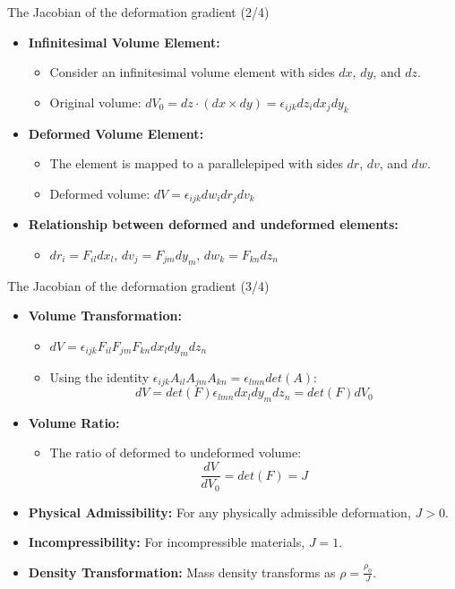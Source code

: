 \documentclass{beamer}
\begin{document}
\begin{frame}{The Jacobian of the deformation gradient (2/4)}
\begin{itemize}
        \item \textbf{Infinitesimal Volume Element:}
        \begin{itemize}
            \item   Consider an infinitesimal volume element with sides $dx$, $dy$, and $dz$.
            \item   Original volume: $dV_0 = dz \cdot (dx \times dy) = \epsilon_{ijk} dz_i dx_j dy_k$
        \end{itemize}
    \item \textbf{Deformed Volume Element:}
        \begin{itemize}
            \item   The element is mapped to a parallelepiped with sides $dr$, $dv$, and $dw$.
            \item   Deformed volume: $dV = \epsilon_{ijk} dw_i dr_j dv_k$
        \end{itemize}
    \item \textbf{Relationship between deformed and undeformed elements:}
         \begin{itemize}
            \item   $dr_i = F_{il} dx_l$,  $dv_j = F_{jm} dy_m$,  $dw_k = F_{kn} dz_n$
         \end{itemize}
\end{itemize}
\end{frame}

\begin{frame}{The Jacobian of the deformation gradient (3/4)}
\begin{itemize}
    \item \textbf{Volume Transformation:}
        \begin{itemize}
            \item   $dV = \epsilon_{ijk} F_{il} F_{jm} F_{kn} dx_l dy_m dz_n$
            \item   Using the identity $\epsilon_{ijk} A_{il} A_{jm} A_{kn} = \epsilon_{lmn} det(A)$:
                \[
                dV = det(F) \epsilon_{lmn} dx_l dy_m dz_n = det(F) dV_0
                \]
        \end{itemize}
    \item \textbf{Volume Ratio:}
        \begin{itemize}
            \item   The ratio of deformed to undeformed volume:
                \[
                \frac{dV}{dV_0} = det(F) = J
                \]
        \end{itemize}
    \item \textbf{Physical Admissibility:} For any physically admissible deformation, $J > 0$.
    \item \textbf{Incompressibility:} For incompressible materials, $J = 1$.
    \item \textbf{Density Transformation:} Mass density transforms as $\rho = \frac{\rho_0}{J}$.
\end{itemize}
\end{frame}
\end{document}
